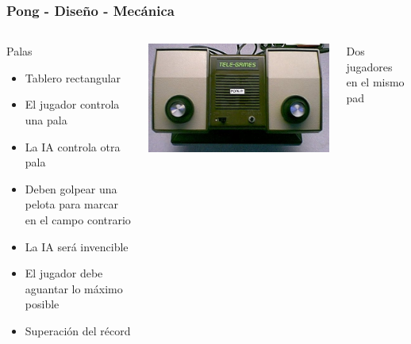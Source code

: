 \begin{frame}
	\frametitle{Pong - Diseño - Mecánica}
	
	\begin{columns}[c]
	\column{175pt}	
	
	\begin{block}{Palas}
		\begin{itemize}
			\item Tablero rectangular
			\item El jugador controla una pala
			\item La IA controla otra pala
			\item Deben golpear una pelota para marcar en el campo contrario
			\item La IA será invencible
			\item El jugador debe aguantar lo máximo posible
			\item Superación del récord
		\end{itemize}            
	\end{block}
	
	\column{125pt}
	
	\begin{center}
		\includegraphics[scale=0.45]{img/telepong.jpg}
	\end{center}
	
	\begin{center}
	    Dos jugadores en el mismo pad
	\end{center}	
	
	\end{columns}
	
\end{frame}

